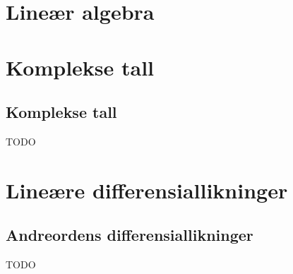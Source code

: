 
\newcommand{\kapittel}[2]{\chapter{#2}}
\newcommand{\kapittelslutt}{}
\renewcommand{\kapittelemnenavn}{}



\def\inkludert{1}


\setlength{\cftpartnumwidth}{3em}

\frontmatter
\tableofcontents*


\mainmatter
\part{Lineær algebra}





















%

%

%

\part{Komplekse tall}

\chapter{Komplekse tall}

TODO

\part{Lineære differensiallikninger}

\chapter{Andreordens differensiallikninger}

TODO


